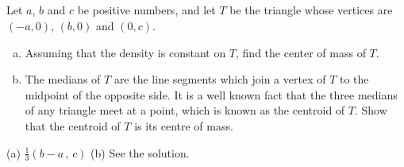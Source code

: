 \subsection*{\Application}

\begin{question}[M200 2003A] %
Let $a$, $b$ and $c$ be positive numbers, and let $T$ be
the triangle whose vertices are $(-a,0)$, $(b,0)$ and $(0,c)$.
\begin{enumerate}[(a)]
\item 
Assuming that the density is constant on $T$, find the center
of mass of $T$.

\item 
The medians of $T$ are the line segments which join a vertex
of $T$ to the midpoint of the opposite side. It is a well known fact that the
three medians of any triangle meet at a point, which is known as the centroid
of $T$. Show that the centroid of $T$ is its centre of mass.
\end{enumerate}
\end{question}

%

\begin{answer}
(a) $\frac{1}{3}(b-a\,,\,c)$\qquad
(b) See the solution.
\end{answer}

